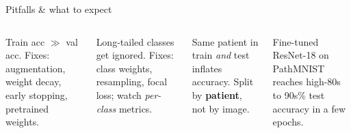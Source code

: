 \documentclass[
11pt,notheorems,hyperref={pdfauthor=whatever}
]{beamer}
\begin{document}
\begin{frame}{Pitfalls \& what to expect}
\small
\begin{columns}[T,onlytextwidth]
    \begin{tcolorbox}[medicalglass, title=\textbf{\color{accCoral}Overfitting}]
    Train acc $\gg$ val acc. Fixes: augmentation, weight decay, early stopping, pretrained
    weights.
    \end{tcolorbox}
    \begin{tcolorbox}[medicalglass, title=\textbf{\color{accAmber}Class imbalance}]
    Long-tailed classes get ignored. Fixes: class weights, resampling, focal loss; watch
    \emph{per-class} metrics.
    \end{tcolorbox}

    \begin{tcolorbox}[medicalglass, title=\textbf{\color{accTeal}Leakage}]
    Same patient in train \emph{and} test inflates accuracy. Split by \textbf{patient}, not
    by image.
    \end{tcolorbox}
    \begin{tcolorbox}[medicalglass, title=\textbf{\color{accGreen}Expect}]
    Fine-tuned ResNet-18 on PathMNIST reaches high-80s to 90s\% test accuracy in a few
    epochs.
    \end{tcolorbox}
\end{columns}
\end{frame}


\end{document}
